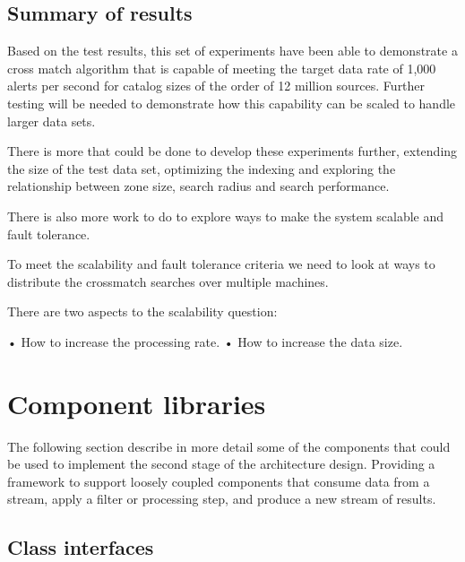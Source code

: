 \documentclass{article}
\begin{document}
\subsection{Summary of results}
\label{crossmatch-summary}

Based on the test results, this set of experiments have been able to demonstrate a cross match algorithm that is capable of meeting the target data rate of 1,000 alerts per second for catalog sizes of the order of 12 million sources. Further testing will be needed to demonstrate how this capability can be scaled to handle larger data sets.

There is more  that could be done to develop these experiments further, extending the size of the test data set, optimizing the indexing and exploring the relationship between zone size, search radius and search performance.

There is also more work to do to explore ways to make the system scalable and fault tolerance.

To meet the scalability and fault tolerance criteria we need to look at ways to distribute the crossmatch searches over multiple machines.

There are two aspects to the scalability question:

    • How to increase the processing rate.
    • How to increase the data size.















\section{Component libraries}
\label{component-libraries}

The following section describe in more detail some of the components that could be used to implement the second stage of the architecture design. Providing a framework to support loosely coupled components that consume data from a stream, apply a filter or processing step, and produce a new stream of results.

\subsection{Class interfaces}
\label{component-libraries.java-interfaces}
\end{document}

